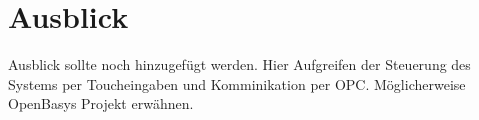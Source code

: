 \documentclass[../../Bachelorarbeit.tex]{subfiles}
\begin{document}
\section{Ausblick}
\color{red}
Ausblick sollte noch hinzugefügt werden. Hier Aufgreifen der Steuerung des Systems per Toucheingaben und Komminikation per OPC. Möglicherweise OpenBasys Projekt erwähnen.
\end{document}
